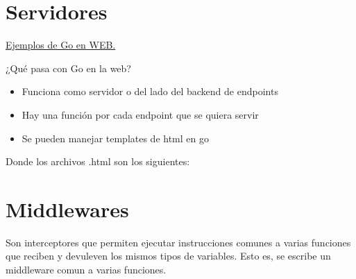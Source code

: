 \documentclass[]{book}
\begin{document}
\section{Servidores}
\begin{center}
    \hyperlink{https://gowebexamples.com/http-server/}{ Ejemplos de Go en WEB.}
\end{center}
\par ¿Qué pasa con Go en la web?
\begin{itemize}
    \item Funciona como servidor o del lado del backend de endpoints
    \item Hay una función por cada endpoint que se quiera servir
    \item Se pueden manejar templates de html en go
\end{itemize}
\begin{tcolorbox}[
    title = Servidor en Go]
    
    
\end{tcolorbox}
\par Donde los archivos .html son los siguientes:

\begin{tcolorbox}[
    title = index.html]
    
\end{tcolorbox}

\begin{tcolorbox}[
    title = login.html
    ]
    
\end{tcolorbox}

\section{Middlewares}
\par Son interceptores que permiten ejecutar instrucciones comunes a varias funciones que reciben y devuleven los mismos tipos de variables. Esto es, se escribe un middleware comun a varias funciones. 
\end{document}
